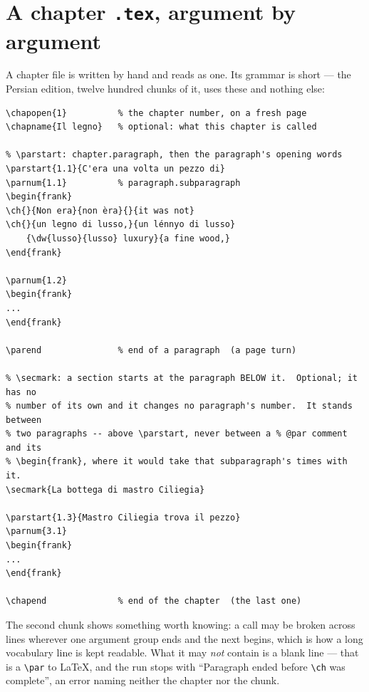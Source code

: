 \documentclass[11pt,oneside]{report}
\newcommand{\file}[1]{\texttt{#1}}
\begin{document}
\section{A chapter \file{.tex}, argument by argument}
\label{sec:chaptex}

A chapter file is written by hand and reads as one. Its grammar is short ---
the Persian edition, twelve hundred chunks of it, uses these and nothing
else:

\begin{lstlisting}
\chapopen{1}          % the chapter number, on a fresh page
\chapname{Il legno}   % optional: what this chapter is called

% \parstart: chapter.paragraph, then the paragraph's opening words
\parstart{1.1}{C'era una volta un pezzo di}
\parnum{1.1}          % paragraph.subparagraph
\begin{frank}
\ch{}{Non era}{non èra}{}{it was not}
\ch{}{un legno di lusso,}{un lénnyo di lusso}
    {\dw{lusso}{lusso} luxury}{a fine wood,}
\end{frank}

\parnum{1.2}
\begin{frank}
...
\end{frank}

\parend               % end of a paragraph  (a page turn)

% \secmark: a section starts at the paragraph BELOW it.  Optional; it has no
% number of its own and it changes no paragraph's number.  It stands between
% two paragraphs -- above \parstart, never between a % @par comment and its
% \begin{frank}, where it would take that subparagraph's times with it.
\secmark{La bottega di mastro Ciliegia}

\parstart{1.3}{Mastro Ciliegia trova il pezzo}
\parnum{3.1}
\begin{frank}
...
\end{frank}

\chapend              % end of the chapter  (the last one)
\end{lstlisting}

\noindent The second chunk shows something worth knowing: a call may be broken
across lines wherever one argument group ends and the next begins, which is how
a long vocabulary line is kept readable. What it may \emph{not} contain is a
blank line --- that is a \verb|\par| to LaTeX, and the run stops with
``Paragraph ended before \verb|\ch| was complete'', an error naming neither
the chapter nor the chunk.
\end{document}
